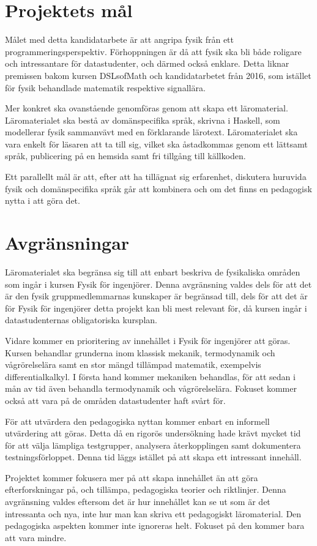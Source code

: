 \section{Projektets mål}

Målet med detta kandidatarbete är att angripa fysik från ett 
programmeringsperspektiv. Förhoppningen är då att fysik ska bli både
roligare och intressantare för datastudenter, och därmed också
enklare. Detta liknar premissen bakom kursen DSLsofMath och kandidatarbetet
från 2016, som istället för fysik behandlade matematik respektive signallära.

Mer konkret ska ovanstående genomföras genom att skapa ett läromaterial.
Läromaterialet ska bestå av
domänspecifika språk, skrivna
i Haskell, som
modellerar fysik sammanvävt med en förklarande lärotext. Läromaterialet ska vara
enkelt för läsaren att ta till sig, vilket ska åstadkommas genom ett lättsamt
språk, publicering på en hemsida samt fri tillgång till källkoden.

Ett parallellt mål är att, efter att ha tillägnat sig erfarenhet, diskutera
huruvida fysik och domänspecifika språk går att kombinera och om det finns en
pedagogisk nytta i att göra det.

\section{Avgränsningar}\label{sec:avgransningar}

Läromaterialet ska begränsa sig till att enbart beskriva de fysikaliska områden
som ingår i kursen Fysik för ingenjörer. Denna avgränsning valdes dels för att
det är den fysik gruppmedlemmarnas kunskaper är begränsad till, dels för att
det är för Fysik för ingenjörer detta projekt kan bli mest relevant för, då
kursen ingår i datastudenternas obligatoriska kursplan.

Vidare kommer en prioritering av innehållet i Fysik för ingenjörer att göras.
Kursen behandlar grunderna inom klassisk mekanik, termodynamik och
vågrörelselära samt en stor mängd tillämpad matematik, exempelvis
differentialkalkyl. I första hand kommer mekaniken behandlas, för att sedan i mån
av tid även behandla termodynamik och vågrörelselära. Fokuset kommer också att
vara på de områden datastudenter haft svårt för.

För att utvärdera den pedagogiska nyttan kommer enbart en informell utvärdering
att göras. Detta då en rigorös undersökning hade krävt mycket tid för att välja
lämpliga testgrupper, analysera återkopplingen samt dokumentera
testningsförloppet. Denna tid läggs istället på att skapa ett intressant innehåll.

Projektet kommer fokusera mer på att skapa innehållet än att göra efterforskningar på, och tillämpa, pedagogiska teorier och riktlinjer. Denna avgränsning valdes eftersom det är hur innehållet kan se ut som är det intressanta och nya, inte hur man kan skriva ett pedagogiskt läromaterial. Den pedagogiska aspekten kommer inte ignoreras helt. Fokuset på den kommer bara att vara mindre.
